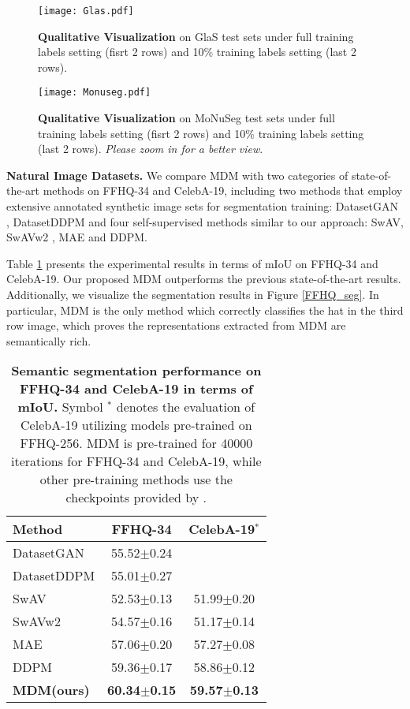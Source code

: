 \documentclass{article} \usepackage{iclr2024_conference,times}
\begin{document}
\begin{figure*}[!ht]
\centering
\texttt{[image: Glas.pdf]} \caption{\textbf{Qualitative Visualization} on GlaS test sets under full training labels setting (fisrt 2 rows) and 10\% training labels setting (last 2 rows).}
\label{Glas_seg}
\end{figure*}



\begin{figure*}[!ht]
\centering
\texttt{[image: Monuseg.pdf]} \caption{\textbf{Qualitative Visualization} on MoNuSeg test sets under full training labels setting (fisrt 2 rows) and 10\% training labels setting (last 2 rows). \textit{Please zoom in for a better view}.}
\label{Monuseg_seg}
\end{figure*}


\textbf{Natural Image Datasets.} We compare MDM with two categories of state-of-the-art methods on FFHQ-34 and CelebA-19, including two methods that employ extensive annotated synthetic image sets for segmentation training: DatasetGAN \citep{DBLP:conf/cvpr/ZhangLGYLB0F21}, DatasetDDPM \citep{DBLP:conf/iclr/BaranchukVRKB22} and four self-supervised methods similar to our approach: 
SwAV, SwAVw2 \citep{DBLP:conf/nips/CaronMMGBJ20}, MAE and DDPM.

Table \ref{FFHQ_and_CelebA} presents the experimental results in terms of mIoU on FFHQ-34 and CelebA-19. Our proposed MDM outperforms the previous state-of-the-art results. Additionally, we visualize the segmentation results in Figure \ref{FFHQ_seg}. 
In particular, MDM is the only method which correctly classifies the hat in the third row image, which proves the representations extracted from MDM are semantically rich.
\begin{table}[!htp]
    \centering
    \caption{\textbf{Semantic segmentation performance on FFHQ-34 and CelebA-19 in terms of mIoU.} Symbol $^{*}$ denotes the evaluation of CelebA-19 utilizing models pre-trained on FFHQ-256. MDM is pre-trained for 40000 iterations for FFHQ-34 and CelebA-19, while other pre-training methods use the checkpoints provided by \citet{DBLP:conf/iclr/BaranchukVRKB22}.}
    \small \begin{tabular}{lcc}
        \toprule
         Method &FFHQ-34 &CelebA-19$^*$\\
        \midrule
        DatasetGAN &55.52$\pm$0.24 &\text{-}\\
        DatasetDDPM &55.01$\pm$0.27 &\text{-}\\
        \midrule
        SwAV  &52.53$\pm$0.13 &51.99$\pm$0.20\\
        SwAVw2 &54.57$\pm$0.16 &51.17$\pm$0.14\\
        \midrule
        MAE        &57.06$\pm$0.20 &57.27$\pm$0.08\\
        DDPM       &59.36$\pm$0.17 &58.86$\pm$0.12 \\
\textbf{MDM(ours)} &\textbf{60.34$\pm$0.15}  &\textbf{59.57$\pm$0.13} \\
        \bottomrule
    \end{tabular}
    \label{FFHQ_and_CelebA}
\end{table}
\end{document}
